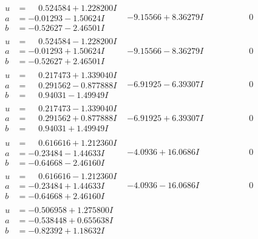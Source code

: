 \documentclass[1p]{elsarticle_modified}
\theoremstyle{definition}
\begin{document}
$$\begin{array}{c|c|c}
 \hline 
\begin{aligned}
u &= \phantom{-}0.524584 + 1.228200 I \\
a &= -0.01293 - 1.50624 I \\
b &= -0.52627 - 2.46501 I\end{aligned}
 & -9.15566 + 8.36279 I & \phantom{-0.000000 } 0 \\ \hline\begin{aligned}
u &= \phantom{-}0.524584 - 1.228200 I \\
a &= -0.01293 + 1.50624 I \\
b &= -0.52627 + 2.46501 I\end{aligned}
 & -9.15566 - 8.36279 I & \phantom{-0.000000 } 0 \\ \hline\begin{aligned}
u &= \phantom{-}0.217473 + 1.339040 I \\
a &= \phantom{-}0.291562 - 0.877888 I \\
b &= \phantom{-}0.94031 - 1.49949 I\end{aligned}
 & -6.91925 - 6.39307 I & \phantom{-0.000000 } 0 \\ \hline\begin{aligned}
u &= \phantom{-}0.217473 - 1.339040 I \\
a &= \phantom{-}0.291562 + 0.877888 I \\
b &= \phantom{-}0.94031 + 1.49949 I\end{aligned}
 & -6.91925 + 6.39307 I & \phantom{-0.000000 } 0 \\ \hline\begin{aligned}
u &= \phantom{-}0.616616 + 1.212360 I \\
a &= -0.23484 - 1.44633 I \\
b &= -0.64668 - 2.46160 I\end{aligned}
 & -4.0936 + 16.0686 I & \phantom{-0.000000 } 0 \\ \hline\begin{aligned}
u &= \phantom{-}0.616616 - 1.212360 I \\
a &= -0.23484 + 1.44633 I \\
b &= -0.64668 + 2.46160 I\end{aligned}
 & -4.0936 - 16.0686 I & \phantom{-0.000000 } 0 \\ \hline\begin{aligned}
u &= -0.506958 + 1.275800 I \\
a &= -0.538448 + 0.655638 I \\
b &= -0.82392 + 1.18632 I\end{aligned}

\end{array}$$
\end{document}
